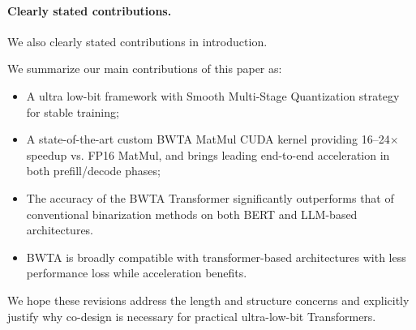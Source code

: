 \begin{revresponse}[]
\paragraph{Clearly stated contributions.} We also clearly stated contributions in introduction. 
\begin{changes}
We summarize our main contributions of this paper as:
\begin{itemize}
    \item A ultra low-bit framework with Smooth Multi-Stage Quantization strategy for stable training; 
    \item A state-of-the-art custom BWTA MatMul CUDA kernel providing 16–24$\times$ speedup vs. FP16 MatMul, and brings leading end-to-end acceleration in both prefill/decode phases; 
    \item The accuracy of the BWTA Transformer significantly outperforms that of conventional binarization methods on both BERT and LLM-based architectures. 
    \item BWTA is broadly compatible with transformer-based architectures with less performance loss while acceleration benefits. 
\end{itemize}
\end{changes}

We hope these revisions address the length and structure concerns and explicitly justify why co-design is necessary for practical ultra-low-bit Transformers. 


\end{revresponse}



